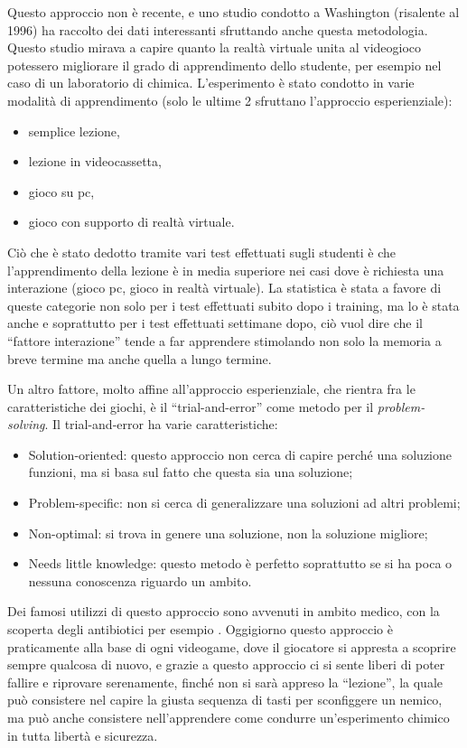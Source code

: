 Questo approccio non è recente, e uno studio condotto a Washington \cite{vreduchristine} (risalente al 1996) ha raccolto dei dati interessanti sfruttando anche questa metodologia.
Questo studio mirava a capire quanto la realtà virtuale unita al videogioco potessero migliorare il grado di apprendimento dello studente, per esempio nel caso di un laboratorio di chimica. L'esperimento è stato condotto in varie modalità di apprendimento (solo le ultime 2 sfruttano l'approccio esperienziale): 

\begin{itemize}
\item semplice lezione,
\item lezione in videocassetta, 
\item gioco su pc, 
\item gioco con supporto di realtà virtuale.
\end{itemize}

Ciò che è stato dedotto tramite vari test effettuati sugli studenti è che l'apprendimento della lezione è in media superiore nei casi dove è richiesta una interazione (gioco pc, gioco in realtà virtuale). La statistica è stata a favore di queste categorie non solo per i test effettuati subito dopo i training, ma lo è stata anche e soprattutto per i test effettuati settimane dopo, ciò vuol dire che il ``fattore interazione'' tende a far apprendere stimolando non solo la memoria a breve termine ma anche quella a lungo termine.

Un altro fattore, molto affine all'approccio esperienziale, che rientra fra le caratteristiche dei giochi, è il ``trial-and-error'' come metodo per il \textit{problem-solving}. Il trial-and-error \cite{trialanderror} ha varie caratteristiche: 

\begin{itemize}
\item Solution-oriented: questo approccio non cerca di capire perché una soluzione funzioni, ma si basa sul fatto che questa sia una soluzione;
\item Problem-specific: non si cerca di generalizzare una soluzioni ad altri problemi;
\item Non-optimal: si trova in genere una soluzione, non la soluzione migliore;
\item Needs little knowledge: questo metodo è perfetto soprattutto se si ha poca o nessuna conoscenza riguardo un ambito.
\end{itemize}

Dei famosi utilizzi di questo approccio sono avvenuti in ambito medico, con la scoperta degli antibiotici per esempio \cite{trialanderror}. Oggigiorno questo approccio è praticamente alla base di ogni videogame, dove il giocatore si appresta a scoprire sempre qualcosa di nuovo, e grazie a questo approccio ci si sente liberi di poter fallire e riprovare serenamente, finché non si sarà appreso la ``lezione'', la quale può consistere nel capire la giusta sequenza di tasti per sconfiggere un nemico, ma può anche consistere nell'apprendere come condurre un'esperimento chimico in tutta libertà e sicurezza.


